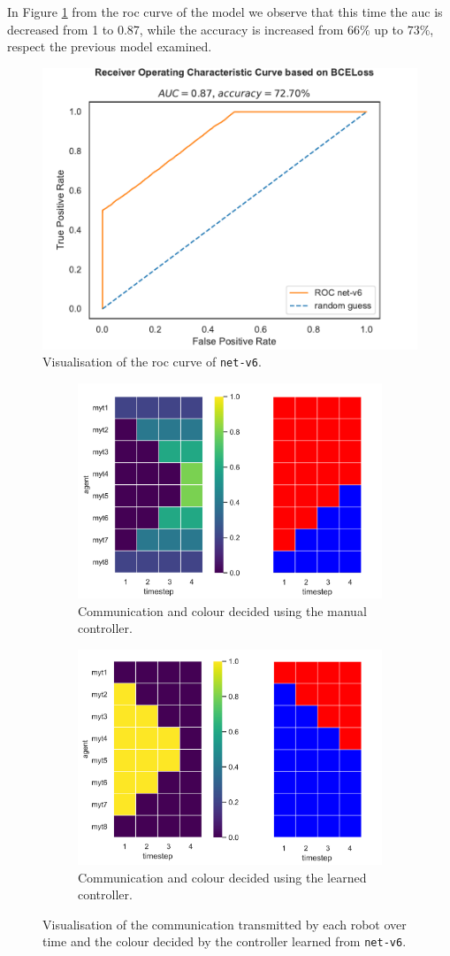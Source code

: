 In Figure \ref{fig:net-v6auc} from the \gls{roc} curve of the model we 
observe that this time the \gls{auc} is decreased from 1 to 0.87, while the accuracy 
is increased from $66\%$ up to $73\%$, respect the previous model examined.
\begin{figure}[!htb]
	\centering
	\includegraphics[width=.5\textwidth]{contents/images/net-v6/roc-net-v6}%
	\caption[Evaluation of the \gls{roc} of \texttt{net-v6}.]{Visualisation of the 
		\gls{roc} curve of \texttt{net-v6}.}
	\label{fig:net-v6auc}
\end{figure}
\begin{figure}[!htb]
	\begin{subfigure}[h]{\textwidth}
		\centering
		\includegraphics[width=.55\textwidth]{contents/images/net-v6/manual-0}
		\caption{Communication and colour decided using the manual controller.}
	\end{subfigure}
	\hspace*{\fill}%
	\vspace*{8pt}%
	\hspace*{\fill}%
	\begin{subfigure}[h]{\textwidth}
		\centering			
		\includegraphics[width=.55\textwidth]{contents/images/net-v6/learned-0}
		\caption{Communication and colour decided using the learned controller.}
	\end{subfigure}
	\caption[Evaluation of the communication learned by 
	\texttt{net-v6}.]{Visualisation of the communication transmitted by each 
		robot over time and the colour decided by the controller learned from 
		\texttt{net-v6}.}	
	\label{fig:net-v6commcolour}
\end{figure}

